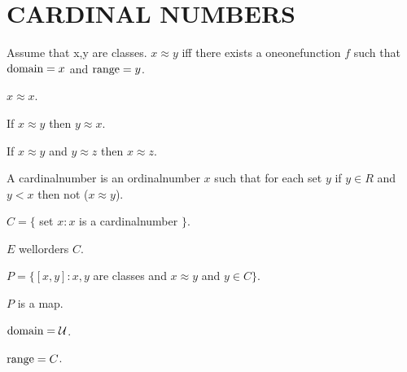 \documentclass[a4paper,draft]{amsproc}
\begin{document}
\section{CARDINAL NUMBERS}
\begin{forthel}

\begin{definition}[144]
Assume that x,y are classes.
$x \approx y$ iff there exists a oneonefunction $f$ such that $\domain f = x$ and $\range f = y$.
\end{definition}

\begin{theorem}[145]
$x \approx x$.
\end{theorem}

\begin{theorem}[146]
If $x \approx y$ then $y \approx x$.
\end{theorem}

\begin{theorem}[147]
If $x \approx y$ and $y \approx z$ then $x \approx z$.
\end{theorem}

\begin{definition}[148]
A cardinalnumber is an ordinalnumber $x$ such that for each set $y$ if $y \in R$ and $y < x$ then not ($x \approx y$).
\end{definition}

\begin{definition}[149]
$C = \{$ set $x : x$ is a cardinalnumber $\}$.
\end{definition}

\begin{theorem}[150]
$E$ wellorders $C$.
\end{theorem}

\begin{definition}[151]
$P = \{[x,y] : x,y$ are classes and $x \approx y$ and $y \in C\}$.
\end{definition}

\begin{theorem}[152a]
$P$ is a map.
\end{theorem}

\begin{theorem}[152b]
$\domain P = \cal{U}$.
\end{theorem}

\begin{theorem}[152c]
$\range P = C$.
\end{theorem}


\end{forthel}
\end{document}
